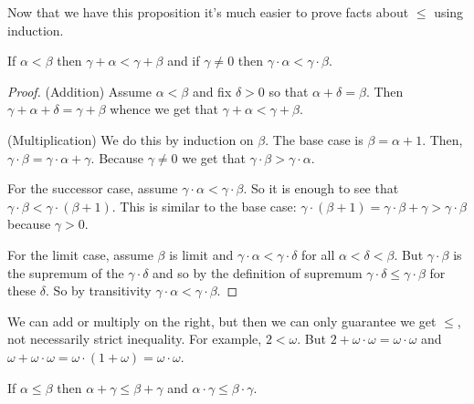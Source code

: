 \documentclass[10pt]{amsart}
\begin{document}
Now that we have this proposition it's much easier to prove facts about $\le$ using induction. 

\begin{proposition}
If $\alpha < \beta$ then $\gamma + \alpha < \gamma + \beta$ and if $\gamma \ne 0$ then $\gamma \cdot \alpha < \gamma \cdot \beta$.
\end{proposition}

\begin{proof}
(Addition) Assume $\alpha < \beta$ and fix $\delta > 0$ so that $\alpha + \delta = \beta$. Then $\gamma + \alpha + \delta = \gamma + \beta$ whence we get that $\gamma + \alpha < \gamma + \beta$.

(Multiplication) We do this by induction on $\beta$. The base case is $\beta = \alpha + 1$. Then, $\gamma \cdot \beta = \gamma \cdot \alpha + \gamma$. Because $\gamma \ne 0$ we get that $\gamma \cdot \beta > \gamma \cdot \alpha$.

For the successor case, assume $\gamma \cdot \alpha < \gamma \cdot \beta$. So it is enough to see that $\gamma \cdot \beta < \gamma \cdot (\beta + 1)$. This is similar to the base case: $\gamma \cdot (\beta + 1) = \gamma \cdot \beta + \gamma > \gamma \cdot \beta$ because $\gamma > 0$.

For the limit case, assume $\beta$ is limit and $\gamma \cdot \alpha < \gamma \cdot \delta$ for all $\alpha < \delta < \beta$. But $\gamma \cdot \beta$ is the supremum of the $\gamma \cdot \delta$ and so by the definition of supremum $\gamma \cdot \delta \le \gamma \cdot \beta$ for these $\delta$. So by transitivity $\gamma \cdot \alpha < \gamma \cdot \beta$.
\end{proof}

We can add or multiply on the right, but then we can only guarantee we get $\le$, not necessarily strict inequality. For example, $2 < \omega$. But $2 + \omega \cdot \omega = \omega \cdot \omega$ and $\omega + \omega \cdot \omega = \omega \cdot (1 + \omega) = \omega \cdot \omega$.

\begin{proposition}
If $\alpha \le \beta$ then $\alpha + \gamma \le \beta + \gamma$ and $\alpha \cdot \gamma \le \beta \cdot \gamma$.
\end{proposition}
\end{document}
